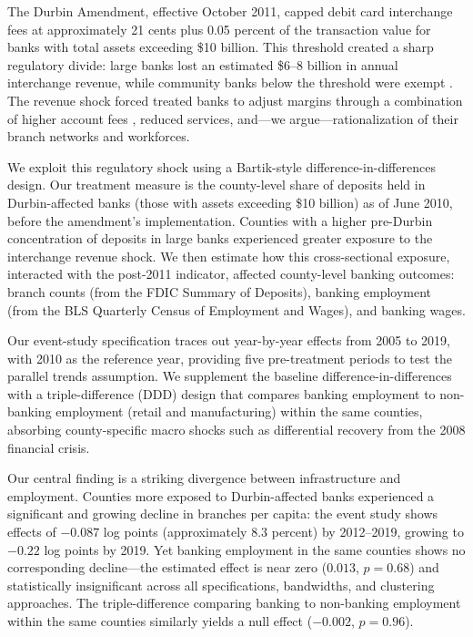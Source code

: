 \documentclass[12pt]{article}
\begin{document}
The Durbin Amendment, effective October 2011, capped debit card interchange fees at approximately 21 cents plus 0.05 percent of the transaction value for banks with total assets exceeding \$10 billion. This threshold created a sharp regulatory divide: large banks lost an estimated \$6--8 billion in annual interchange revenue, while community banks below the threshold were exempt \citep{hayashi2012, wang2014}. The revenue shock forced treated banks to adjust margins through a combination of higher account fees \citep{kay2014}, reduced services, and---we argue---rationalization of their branch networks and workforces.

We exploit this regulatory shock using a Bartik-style difference-in-differences design. Our treatment measure is the county-level share of deposits held in Durbin-affected banks (those with assets exceeding \$10 billion) as of June 2010, before the amendment's implementation. Counties with a higher pre-Durbin concentration of deposits in large banks experienced greater exposure to the interchange revenue shock. We then estimate how this cross-sectional exposure, interacted with the post-2011 indicator, affected county-level banking outcomes: branch counts (from the FDIC Summary of Deposits), banking employment (from the BLS Quarterly Census of Employment and Wages), and banking wages.

Our event-study specification traces out year-by-year effects from 2005 to 2019, with 2010 as the reference year, providing five pre-treatment periods to test the parallel trends assumption. We supplement the baseline difference-in-differences with a triple-difference (DDD) design that compares banking employment to non-banking employment (retail and manufacturing) within the same counties, absorbing county-specific macro shocks such as differential recovery from the 2008 financial crisis.

Our central finding is a striking divergence between infrastructure and employment. Counties more exposed to Durbin-affected banks experienced a significant and growing decline in branches per capita: the event study shows effects of $-0.087$ log points (approximately 8.3 percent) by 2012--2019, growing to $-0.22$ log points by 2019. Yet banking employment in the same counties shows no corresponding decline---the estimated effect is near zero ($0.013$, $p = 0.68$) and statistically insignificant across all specifications, bandwidths, and clustering approaches. The triple-difference comparing banking to non-banking employment within the same counties similarly yields a null effect ($-0.002$, $p = 0.96$).
\end{document}
